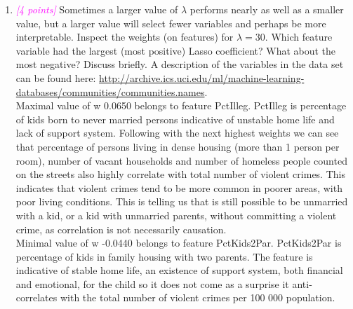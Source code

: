 \documentclass{article}
\newcommand{\1}{\mathbf{1}}
\newcommand{\points}[1]{\small\textcolor{magenta}{\emph{[#1 points]}} \normalsize}
\begin{document}
\begin{enumerate}
    \newpage
    \item \points{4} Sometimes a larger value of $\lambda$ performs nearly as well as a smaller value, but a larger value will select fewer variables and perhaps be more interpretable. Inspect the weights (on features) for $\lambda = 30$. Which feature variable had the largest (most positive) Lasso coefficient? What about the most negative? Discuss briefly. A description of the variables in the data set can be found here: \url{http://archive.ics.uci.edu/ml/machine-learning-databases/communities/communities.names}. \\
    
    Maximal value of w 0.0650 belongs to feature PctIlleg. PctIlleg is percentage of kids born to never married persons indicative of unstable home life and lack of support system. Following with the next highest weights we can see that percentage of persons living in dense housing (more than 1 person per room), number of vacant households and number of homeless people counted on the streets also highly correlate with total number of violent crimes. This indicates that violent crimes tend to be more common in poorer areas, with poor living conditions. This is telling us that is still possible to be unmarried with a kid, or a kid with unmarried parents, without committing a violent crime, as correlation is not necessarily causation.  \\
    Minimal value of w -0.0440 belongs to feature PctKids2Par. PctKids2Par is percentage of kids in family housing with two parents. The feature is indicative of stable home life, an existence of support system, both financial and emotional, for the child so it does not come as a surprise it anti-correlates with the total number of violent crimes per 100 000 population. 


\end{enumerate}
\end{document}
